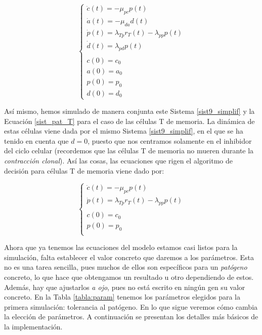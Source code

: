 \begin{equation}
	\label{sist9_simplif}
	\left\{ \begin{array}{l}
	\dot{c}(t) = -\mu_{pc}p(t) \\
	\dot{a}(t) = -\mu_{da}d(t)  \\
	\dot{p}(t) = \lambda_{Tp}r_{T}(t) - \lambda_{pp}p(t) \\
	\dot{d}(t) = \lambda_{pd}p(t) \\
	\\
	c(0)=c_0 \\
	a(0)=a_0 \\
	p(0)=p_0 \\
	d(0)=d_0 
	\end{array}
	\right.
\end{equation}

Así mismo, hemos simulado de manera conjunta este Sistema \ref{sist9_simplif} y la Ecuación \ref{sist_pat_T} para el caso de las células T de memoria. La dinámica de estas células viene dada por el mismo Sistema \ref{sist9_simplif}, en el que se ha tenido en cuenta que $d=0$, puesto que nos centramos solamente en el inhibidor del ciclo celular (recordemos que las células T de memoria no mueren durante la \textit{contracción clonal}). Así las cosas, las ecuaciones que rigen el algoritmo de decisión para células T de memoria viene dado por: 

\begin{equation}
	\label{sist15_simplif}
	\left\{ \begin{array}{l}
	\dot{c}(t) = -\mu_{pc}p(t) \\
	\dot{p}(t) = \lambda_{Tp}r_{T}(t) - \lambda_{pp}p(t) \\
	\\
	c(0)=c_0 \\
	p(0)=p_0 \\
	\end{array}
	\right.
\end{equation}

Ahora que ya tenemos las ecuaciones del modelo estamos casi listos para la simulación, falta establecer el valor concreto que daremos a los parámetros. Esta no es una tarea sencilla, pues muchos de ellos son específicos para un \textit{patógeno} concreto, lo que hace que obtengamos un resultado u otro dependiendo de estos. Además, hay que ajustarlos \textit{a ojo}, pues no está escrito en ningún gen su valor concreto. En la Tabla \ref{tabla:param} tenemos los parámetros elegidos para la primera simulación: tolerancia al patógeno. En lo que sigue veremos cómo cambia la elección de parámetros. A continuación se presentan los detalles más básicos de la implementación.



